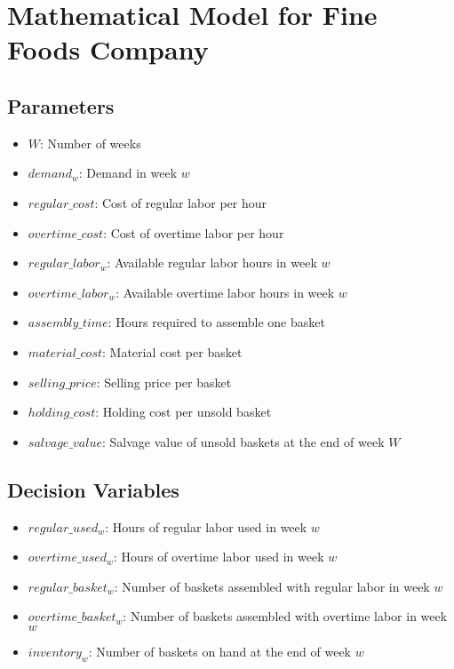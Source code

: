 \documentclass{article}
\begin{document}
\section*{Mathematical Model for Fine Foods Company}

\subsection*{Parameters}
\begin{itemize}
    \item \( W \): Number of weeks
    \item \( demand_w \): Demand in week \( w \)
    \item \( regular\_cost \): Cost of regular labor per hour
    \item \( overtime\_cost \): Cost of overtime labor per hour
    \item \( regular\_labor_w \): Available regular labor hours in week \( w \)
    \item \( overtime\_labor_w \): Available overtime labor hours in week \( w \)
    \item \( assembly\_time \): Hours required to assemble one basket
    \item \( material\_cost \): Material cost per basket
    \item \( selling\_price \): Selling price per basket
    \item \( holding\_cost \): Holding cost per unsold basket
    \item \( salvage\_value \): Salvage value of unsold baskets at the end of week \( W \)
\end{itemize}

\subsection*{Decision Variables}
\begin{itemize}
    \item \( regular\_used_w \): Hours of regular labor used in week \( w \)
    \item \( overtime\_used_w \): Hours of overtime labor used in week \( w \)
    \item \( regular\_basket_w \): Number of baskets assembled with regular labor in week \( w \)
    \item \( overtime\_basket_w \): Number of baskets assembled with overtime labor in week \( w \)
    \item \( inventory_w \): Number of baskets on hand at the end of week \( w \)
\end{itemize}
\end{document}
